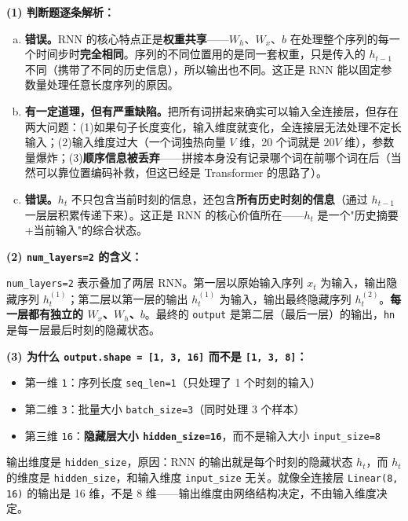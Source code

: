 \documentclass[a4paper,11pt]{ctexart}
\begin{document}
\begin{solutionbox}[参考答案与详细解析]
    \textbf{(1) 判断题逐条解析：}

    \begin{enumerate}[a.]
        \item \textbf{错误。}RNN 的核心特点正是\textbf{权重共享}——$W_h$、$W_x$、$b$ 在处理整个序列的每一个时间步时\textbf{完全相同}。序列的不同位置用的是同一套权重，只是传入的 $h_{t-1}$ 不同（携带了不同的历史信息），所以输出也不同。这正是 RNN 能以固定参数量处理任意长度序列的原因。

        \item \textbf{有一定道理，但有严重缺陷。}把所有词拼起来确实可以输入全连接层，但存在两大问题：(1)如果句子长度变化，输入维度就变化，全连接层无法处理不定长输入；(2)输入维度过大（一个词独热向量 $V$ 维，20 个词就是 $20V$ 维），参数量爆炸；(3)\textbf{顺序信息被丢弃}——拼接本身没有记录哪个词在前哪个词在后（当然可以靠位置编码补救，但这已经是 Transformer 的思路了）。

        \item \textbf{错误。}$h_t$ 不只包含当前时刻的信息，还包含\textbf{所有历史时刻的信息}（通过 $h_{t-1}$ 一层层积累传递下来）。这正是 RNN 的核心价值所在——$h_t$ 是一个"历史摘要+当前输入"的综合状态。
    \end{enumerate}

    \vspace{0.5em}
    \textbf{(2) \texttt{num\_layers=2} 的含义：}

    \texttt{num\_layers=2} 表示叠加了两层 RNN。第一层以原始输入序列 $x_t$ 为输入，输出隐藏序列 $h_t^{(1)}$；第二层以第一层的输出 $h_t^{(1)}$ 为输入，输出最终隐藏序列 $h_t^{(2)}$。\textbf{每一层都有独立的 $W_x$、$W_h$、$b$}。最终的 \texttt{output} 是第二层（最后一层）的输出，\texttt{hn} 是每一层最后时刻的隐藏状态。

    \vspace{0.5em}
    \textbf{(3) 为什么 \texttt{output.shape = [1, 3, 16]} 而不是 \texttt{[1, 3, 8]}：}

    \begin{keybox}[三个维度的含义]
        \begin{itemize}
            \item 第一维 \texttt{1}：序列长度 \texttt{seq\_len=1}（只处理了 1 个时刻的输入）
            \item 第二维 \texttt{3}：批量大小 \texttt{batch\_size=3}（同时处理 3 个样本）
            \item 第三维 \texttt{16}：\textbf{隐藏层大小 \texttt{hidden\_size=16}}，而不是输入大小 \texttt{input\_size=8}
        \end{itemize}
        输出维度是 \texttt{hidden\_size}，原因：RNN 的输出就是每个时刻的隐藏状态 $h_t$，而 $h_t$ 的维度是 \texttt{hidden\_size}，和输入维度 \texttt{input\_size} 无关。就像全连接层 \texttt{Linear(8, 16)} 的输出是 16 维，不是 8 维——输出维度由网络结构决定，不由输入维度决定。
    \end{keybox}
\end{solutionbox}
\end{document}
